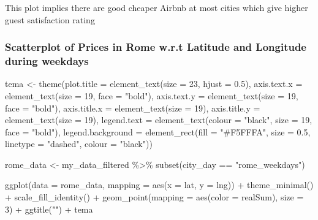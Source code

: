 \documentclass[
]{article}
\newenvironment{Shaded}{\begin{snugshade}}{\end{snugshade}}
\newcommand{\AttributeTok}[1]{\textcolor[rgb]{0.77,0.63,0.00}{#1}}
\newcommand{\DecValTok}[1]{\textcolor[rgb]{0.00,0.00,0.81}{#1}}
\newcommand{\FloatTok}[1]{\textcolor[rgb]{0.00,0.00,0.81}{#1}}
\newcommand{\FunctionTok}[1]{\textcolor[rgb]{0.00,0.00,0.00}{#1}}
\newcommand{\NormalTok}[1]{#1}
\newcommand{\OtherTok}[1]{\textcolor[rgb]{0.56,0.35,0.01}{#1}}
\newcommand{\SpecialCharTok}[1]{\textcolor[rgb]{0.00,0.00,0.00}{#1}}
\newcommand{\StringTok}[1]{\textcolor[rgb]{0.31,0.60,0.02}{#1}}
\begin{document}
This plot implies there are good cheaper Airbnb at most cities which
give higher guest satisfaction rating

\hypertarget{scatterplot-of-prices-in-rome-w.r.t-latitude-and-longitude-during-weekdays}{%
\subsubsection{Scatterplot of Prices in Rome w.r.t Latitude and
Longitude during
weekdays}\label{scatterplot-of-prices-in-rome-w.r.t-latitude-and-longitude-during-weekdays}}

\begin{Shaded}
\begin{Highlighting}[]
\NormalTok{tema }\OtherTok{\textless{}{-}} \FunctionTok{theme}\NormalTok{(}\AttributeTok{plot.title =} \FunctionTok{element\_text}\NormalTok{(}\AttributeTok{size =} \DecValTok{23}\NormalTok{, }\AttributeTok{hjust =} \FloatTok{0.5}\NormalTok{),}
    \AttributeTok{axis.text.x =} \FunctionTok{element\_text}\NormalTok{(}\AttributeTok{size =} \DecValTok{19}\NormalTok{, }\AttributeTok{face =} \StringTok{"bold"}\NormalTok{), }\AttributeTok{axis.text.y =} \FunctionTok{element\_text}\NormalTok{(}\AttributeTok{size =} \DecValTok{19}\NormalTok{,}
        \AttributeTok{face =} \StringTok{"bold"}\NormalTok{), }\AttributeTok{axis.title.x =} \FunctionTok{element\_text}\NormalTok{(}\AttributeTok{size =} \DecValTok{19}\NormalTok{),}
    \AttributeTok{axis.title.y =} \FunctionTok{element\_text}\NormalTok{(}\AttributeTok{size =} \DecValTok{19}\NormalTok{), }\AttributeTok{legend.text =} \FunctionTok{element\_text}\NormalTok{(}\AttributeTok{colour =} \StringTok{"black"}\NormalTok{,}
        \AttributeTok{size =} \DecValTok{19}\NormalTok{, }\AttributeTok{face =} \StringTok{"bold"}\NormalTok{), }\AttributeTok{legend.background =} \FunctionTok{element\_rect}\NormalTok{(}\AttributeTok{fill =} \StringTok{"\#F5FFFA"}\NormalTok{,}
        \AttributeTok{size =} \FloatTok{0.5}\NormalTok{, }\AttributeTok{linetype =} \StringTok{"dashed"}\NormalTok{, }\AttributeTok{colour =} \StringTok{"black"}\NormalTok{))}

\NormalTok{rome\_data }\OtherTok{\textless{}{-}}\NormalTok{ my\_data\_filtered }\SpecialCharTok{\%\textgreater{}\%}
    \FunctionTok{subset}\NormalTok{(city\_day }\SpecialCharTok{==} \StringTok{"rome\_weekdays"}\NormalTok{)}

\FunctionTok{ggplot}\NormalTok{(}\AttributeTok{data =}\NormalTok{ rome\_data, }\AttributeTok{mapping =} \FunctionTok{aes}\NormalTok{(}\AttributeTok{x =}\NormalTok{ lat, }\AttributeTok{y =}\NormalTok{ lng)) }\SpecialCharTok{+} \FunctionTok{theme\_minimal}\NormalTok{() }\SpecialCharTok{+}
    \FunctionTok{scale\_fill\_identity}\NormalTok{() }\SpecialCharTok{+} \FunctionTok{geom\_point}\NormalTok{(}\AttributeTok{mapping =} \FunctionTok{aes}\NormalTok{(}\AttributeTok{color =}\NormalTok{ realSum),}
    \AttributeTok{size =} \DecValTok{3}\NormalTok{) }\SpecialCharTok{+} \FunctionTok{ggtitle}\NormalTok{(}\StringTok{""}\NormalTok{) }\SpecialCharTok{+}\NormalTok{ tema}
\end{Highlighting}
\end{Shaded}
\end{document}
